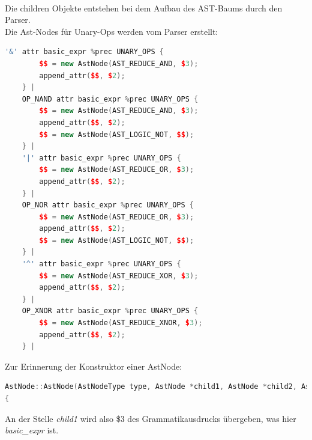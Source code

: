 \documentclass[11pt]{report}
\begin{document}
\\
Die children Objekte entstehen bei dem Aufbau des AST-Baums durch den Parser.
\\
Die Ast-Nodes für Unary-Ops werden vom Parser erstellt:
\begin{lstlisting}[language=C++]
'&' attr basic_expr %prec UNARY_OPS {
		$$ = new AstNode(AST_REDUCE_AND, $3);
		append_attr($$, $2);
	} |
	OP_NAND attr basic_expr %prec UNARY_OPS {
		$$ = new AstNode(AST_REDUCE_AND, $3);
		append_attr($$, $2);
		$$ = new AstNode(AST_LOGIC_NOT, $$);
	} |
	'|' attr basic_expr %prec UNARY_OPS {
		$$ = new AstNode(AST_REDUCE_OR, $3);
		append_attr($$, $2);
	} |
	OP_NOR attr basic_expr %prec UNARY_OPS {
		$$ = new AstNode(AST_REDUCE_OR, $3);
		append_attr($$, $2);
		$$ = new AstNode(AST_LOGIC_NOT, $$);
	} |
	'^' attr basic_expr %prec UNARY_OPS {
		$$ = new AstNode(AST_REDUCE_XOR, $3);
		append_attr($$, $2);
	} |
	OP_XNOR attr basic_expr %prec UNARY_OPS {
		$$ = new AstNode(AST_REDUCE_XNOR, $3);
		append_attr($$, $2);
	} |
\end{lstlisting}
Zur Erinnerung der Konstruktor einer AstNode:
\begin{lstlisting}[language=C++]
AstNode::AstNode(AstNodeType type, AstNode *child1, AstNode *child2, AstNode *child3)
{
\end{lstlisting}
An der Stelle \textit{child1} wird also \$3 des Grammatikausdrucks übergeben, was hier \textit{basic\_expr} ist.\\
\end{document}
